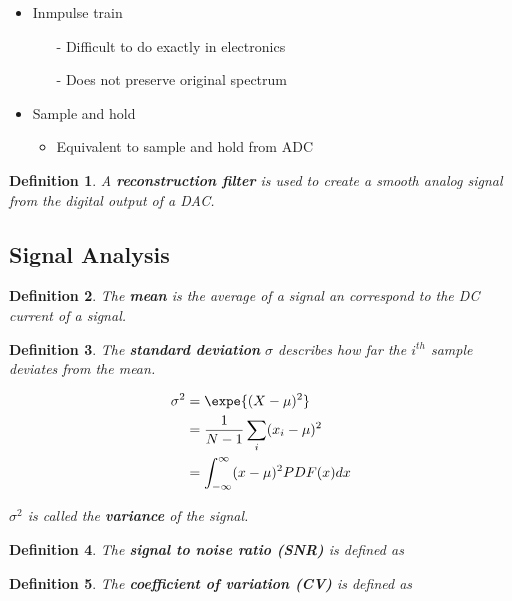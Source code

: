 \documentclass[10pt,a4paper]{scrartcl}
\newtheorem{define}{Definition}
\begin{document}
\begin{multicols*}{2}
\begin{itemize}
\item Inmpulse train
\begin{itemize}
\item[-] Difficult to do exactly in electronics
\item[-] Does not preserve original spectrum
\end{itemize}
\item Sample and hold
\begin{itemize}
\item Equivalent to sample and hold from ADC
\end{itemize}
\end{itemize}

\begin{define}
A \textbf{reconstruction filter} is used to create a smooth analog signal from the digital output of a DAC.
\end{define}

\subsection{Signal Analysis}

\begin{define}
The \textbf{mean} is the average of a signal an correspond to the DC current of a signal.

\end{define}

\begin{define}
The \textbf{standard deviation} $\sigma$ describes how far the $i^{th}$ sample deviates from the mean.

\begin{align*}
\sigma^2&=\expe{(X-\mu)^2}\\
&=\frac{1}{N-1}\sum\limits_i (x_i-\mu)^2\\
&=\int_{-\infty}^\infty (x-\mu)^2 PDF(x)dx
\end{align*}

$\sigma^2$ is called the \textbf{variance} of the signal.
\end{define}

\begin{define}
The \textbf{signal to noise ratio (SNR)} is defined as

\end{define}

\begin{define}
The \textbf{coefficient of variation (CV)} is defined as


\end{define}
\end{multicols*}
\end{document}
